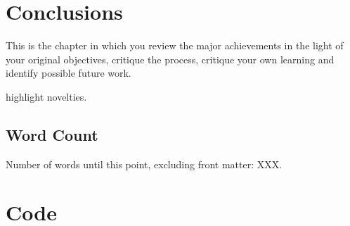 \documentclass[12pt,a4paper]{report}
\theoremstyle{definition}
\theoremstyle{remark}
\begin{document}
\chapter{Conclusions}


This is the chapter in which you review the major achievements in the light of your original objectives, critique the process, critique your own learning and identify possible future work.

highlight novelties.

\vfill
\section{Word Count}
Number of words until this point, excluding front matter: XXX.



\appendix





\chapter{Code}
\end{document}

